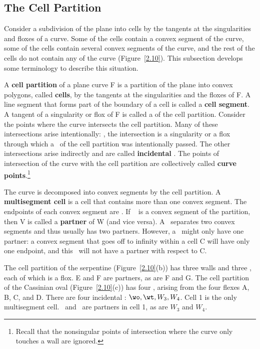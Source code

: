 \subsection{The Cell Partition}

Consider a subdivision of the plane into cells by the
tangents at the singularities and floxes of a curve.
Some of the cells contain a convex segment of the curve,
some of the cells contain several convex segments of the curve,
and the rest of the cells do not contain any of the curve
(Figure~\ref{2.10}).
This subsection develops some terminology to describe this situation.

\begin{definition}
A {\bf cell partition} of a plane curve F is a partition of the plane
into convex polygons, called {\bf cells}, by the tangents at the singularities
and the floxes of F.
A line segment that forms part of the boundary of a cell 
is called a {\bf cell segment}.
A tangent of a singularity or flox of F is called a {\bf \wall} 
of the cell partition.
Consider the points where the curve intersects the cell partition.
Many of these intersections arise 
intentionally: \ie, the intersection is a singularity or a flox through
which a \wall\ of the cell partition was intentionally passed.
The other intersections arise
indirectly and are called {\bf incidental} \wallpoints.
The points of intersection of the curve with the cell partition
are collectively called {\bf curve points}.\footnote{Recall that
the nonsingular points of intersection where the curve
only touches a wall are ignored.}

The curve is decomposed into convex segments by the cell partition.
A {\bf multisegment cell} is a cell that contains more than one 
convex segment.
The endpoints of each convex segment are \wallpoints.
If \  is a convex segment of the partition, then V is called
a {\bf partner} of W (and vice versa).
A \wallpoint\ separates two convex segments and thus usually has two partners.
However, a \wallpoint\ might only have one partner: a convex
segment that goes off to infinity within a cell C will have only one endpoint,
and this \wallpoint\ will not have a partner with respect to C.
\end{definition}
%
\begin{example}
The cell partition of the serpentine (Figure~\ref{2.10}(b)) has three
walls and three \wallpoints, each of which is a flox.
E and F are partners, as are F and G.
The cell partition of the Cassinian oval (Figure~\ref{2.10}(c)) 
has four \walls,
arising from the four flexes A, B, C, and D. 
There are four incidental \wallpoints: $\wo,\wt,W_{3},W_{4}$.
Cell 1 is the only multisegment cell.
\wo\ and \wt\ are partners in cell 1, as are $W_{3}$ and $W_{4}$.
\end{example}
